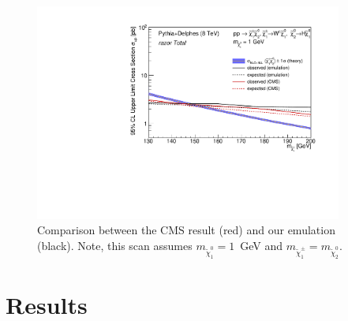 
\begin{figure}[htb]\centering
\includegraphics[width=0.9\textwidth]{figs/pheno/xsecUL_TChiwh_1_Total.pdf}
\caption{\label{fig:TChiwh1dLimit} Comparison between the CMS
 result (red) and our emulation (black). Note, this scan assumes
 $m_{\tilde\chi_1^0}=1$~GeV and $m_{\tilde{\chi}_1^{\pm}}=m_{\tilde{\chi}_2^0}$.}
\end{figure}


\section{Results}
\label{sec:results}

